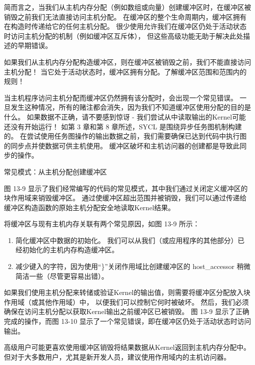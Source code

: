 简而言之，当我们从主机内存分配（例如数组或向量）创建缓冲区时，在缓冲区被销毁之前我们无法直接访问主机分配。 
在缓冲区的整个生命周期内，缓冲区拥有在构造时传递给它的任何主机分配。 
很少使用允许我们在缓冲区仍处于活动状态时访问主机分配的机制（例如缓冲区互斥体），
但这些高级功能无助于解决此处描述的早期错误。

\begin{remark}
如果我们从主机内存分配构造缓冲区，则在缓冲区被销毁之前，我们不能直接访问主机分配！
当它处于活动状态时，缓冲区拥有分配。了解缓冲区范围和范围内的规则！
\end{remark}

当主机程序访问主机分配而缓冲区仍然拥有该分配时，会出现一个常见错误。 
一旦发生这种情况，所有的赌注都会消失，因为我们不知道缓冲区使用分配的目的是什么。 
如果数据不正确，请不要感到惊讶 - 我们尝试从中读取输出的Kernel可能还没有开始运行！ 
如第 3 章和第 8 章所述，SYCL 是围绕异步任务图机制构建的。 
在尝试使用任务图操作的输出数据之前，我们需要确保已达到代码中执行图的同步点并使数据可供主机使用。 
缓冲区破坏和主机访问器的创建都是导致此同步的操作。

{\color{red} 常见模式：从主机分配创建缓冲区}

图 13-9 显示了我们经常编写的代码的常见模式，其中我们通过关闭定义缓冲区的块作用域来销毁缓冲区。 
通过使缓冲区超出范围并被销毁，我们可以通过传递给缓冲区构造函数的原始主机分配安全地读取Kernel结果。

将缓冲区与现有主机内存关联有两个常见原因，如图 13-9 所示：

\begin{enumerate}
	\item 简化缓冲区中数据的初始化。 我们可以从我们（或应用程序的其他部分）已经初始化的主机内存构造缓冲区。

	\item 减少键入的字符，因为使用“\}”关闭作用域比创建缓冲区的 host\_accessor 稍微简洁一些（尽管更容易出错）。
\end{enumerate}

如果我们使用主机分配来转储或验证Kernel的输出值，则需要将缓冲区分配放入块作用域（或其他作用域）中，
以便我们可以控制它何时被破坏。 然后，我们必须确保在访问主机分配以获取Kernel输出之前缓冲区已被销毁。 
图 13-9 显示了正确完成的操作，而图 13-10 显示了一个常见错误，即在缓冲区仍处于活动状态时访问输出。

\begin{remark}
	高级用户可能更喜欢使用缓冲区销毁将结果数据从Kernel返回到主机内存分配中。
	但对于大多数用户，尤其是新开发人员，建议使用作用域内的主机访问器。
\end{remark}

